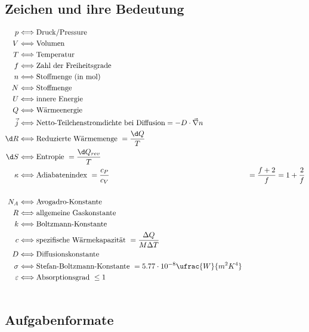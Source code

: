 \documentclass[11pt,letterpaper]{article}
\begin{document}
\subsection{Zeichen und ihre Bedeutung}
\begin{align*}
    p &\Longleftrightarrow \text{Druck/Pressure}\\
    V &\Longleftrightarrow \text{Volumen}\\
    T &\Longleftrightarrow \text{Temperatur}\\
    f &\Longleftrightarrow \text{Zahl der Freiheitsgrade}\\
    n &\Longleftrightarrow \text{Stoffmenge (in mol)}\\
    N &\Longleftrightarrow \text{Stoffmenge}\\
    U &\Longleftrightarrow \text{innere Energie}\\
    Q &\Longleftrightarrow \text{Wärmeenergie}\\
    \vec{j} &\Longleftrightarrow \text{Netto-Teilchenstromdichte bei Diffusion} = -D\cdot \vec{\nabla}n\\
    \d R &\Longleftrightarrow \text{Reduzierte Wärmemenge} \ = \frac{\d Q}{T}\\
    \d S &\Longleftrightarrow \text{Entropie} \ = \frac{\d Q_{rev}}{T}\\
    \kappa &\Longleftrightarrow \text{Adiabatenindex} \ = \frac{c_P}{c_V} &= \frac{f+2}{f}=1+\frac{2}{f}\\
    \\
    N_A &\Longleftrightarrow \text{Avogadro-Konstante}\\
    R &\Longleftrightarrow \text{allgemeine Gaskonstante}\\
    k &\Longleftrightarrow \text{Boltzmann-Konstante}\\
    c &\Longleftrightarrow \text{spezifische Wärmekapazität}\ = \frac{\Delta Q}{M\Delta T}\\
    D &\Longleftrightarrow \text{Diffusionskonstante}\\
    \sigma &\Longleftrightarrow \text{Stefan-Boltzmann-Konstante}\ = 5.77\cdot 10^{-8}\ufrac{W}{m^2K^4}\\
    \varepsilon &\Longleftrightarrow \text{Absorptionsgrad}\ \le 1\\\\
\end{align*}
\subsection{Aufgabenformate}
\end{document}
